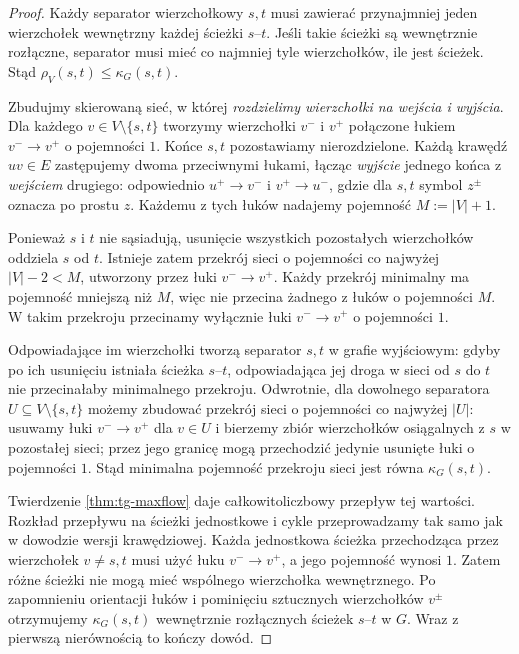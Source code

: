 \begin{proof}
Każdy separator wierzchołkowy $s,t$ musi zawierać
przynajmniej jeden wierzchołek wewnętrzny każdej
ścieżki $s$--$t$. Jeśli takie ścieżki są wewnętrznie
rozłączne, separator musi mieć co najmniej tyle
wierzchołków, ile jest ścieżek. Stąd
$\rho_V(s,t)\le\kappa_G(s,t)$.

Zbudujmy skierowaną sieć, w której \emph{rozdzielimy
wierzchołki na wejścia i wyjścia}. Dla każdego
$v\in V\setminus\{s,t\}$ tworzymy wierzchołki
$v^-$ i $v^+$ połączone łukiem $v^-\to v^+$
o pojemności $1$. Końce $s,t$ pozostawiamy
nierozdzielone. Każdą krawędź $uv\in E$
zastępujemy dwoma przeciwnymi łukami,
łącząc \emph{wyjście} jednego końca z \emph{wejściem}
drugiego: odpowiednio $u^+\to v^-$ i $v^+\to u^-$,
gdzie dla $s,t$ symbol $z^\pm$ oznacza po prostu $z$.
Każdemu z tych łuków nadajemy pojemność
$M:=|V|+1$.

Ponieważ $s$ i $t$ nie sąsiadują, usunięcie wszystkich
pozostałych wierzchołków oddziela $s$ od $t$.
Istnieje zatem przekrój sieci o pojemności co najwyżej
$|V|-2<M$, utworzony przez łuki $v^-\to v^+$.
Każdy przekrój minimalny ma pojemność mniejszą niż $M$,
więc nie przecina żadnego z łuków o pojemności $M$.
W takim przekroju przecinamy wyłącznie łuki
$v^-\to v^+$ o pojemności $1$.

Odpowiadające im wierzchołki tworzą separator
$s,t$ w grafie wyjściowym: gdyby po ich usunięciu
istniała ścieżka $s$--$t$, odpowiadająca jej droga
w sieci od $s$ do $t$ nie przecinałaby minimalnego
przekroju. Odwrotnie, dla dowolnego separatora
$U\subseteq V\setminus\{s,t\}$ możemy zbudować
przekrój sieci o pojemności co najwyżej $|U|$:
usuwamy łuki $v^-\to v^+$ dla $v\in U$ i bierzemy
zbiór wierzchołków osiągalnych z $s$ w pozostałej
sieci; przez jego granicę mogą przechodzić
jedynie usunięte łuki o pojemności $1$.
Stąd minimalna pojemność przekroju sieci jest
równa $\kappa_G(s,t)$.

Twierdzenie \ref{thm:tg-maxflow} daje całkowitoliczbowy
przepływ tej wartości. Rozkład przepływu na ścieżki
jednostkowe i cykle przeprowadzamy tak samo jak
w dowodzie wersji krawędziowej. Każda jednostkowa
ścieżka przechodząca przez wierzchołek $v\ne s,t$
musi użyć łuku $v^-\to v^+$, a jego pojemność wynosi $1$.
Zatem różne ścieżki nie mogą mieć wspólnego wierzchołka
wewnętrznego. Po zapomnieniu orientacji łuków
i pominięciu sztucznych wierzchołków $v^\pm$
otrzymujemy $\kappa_G(s,t)$ wewnętrznie rozłącznych
ścieżek $s$--$t$ w $G$. Wraz z pierwszą nierównością
to kończy dowód.
\end{proof}

